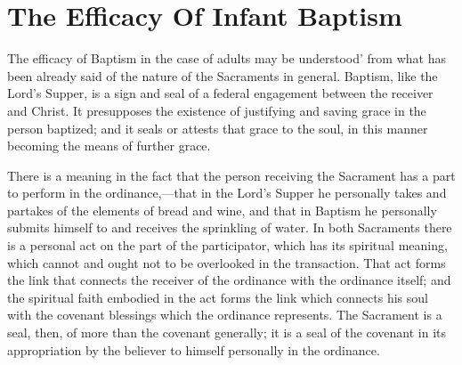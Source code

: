 \documentclass[]{book}
\begin{document}
\hypertarget{the-efficacy-of-infant-baptism}{%
\section{The Efficacy Of Infant Baptism}\label{the-efficacy-of-infant-baptism}}

The efficacy of Baptism in the case of adults may be understood' from what has been already said of the nature of the Sacraments in general. Baptism, like the Lord's Supper, is a sign and seal of a federal engagement between the receiver and Christ. It presupposes the existence of justifying and saving grace in the person baptized; and it seals or attests that grace to the soul, in this manner becoming the means of further grace.

There is a meaning in the fact that the person receiving the Sacrament has a part to perform in the ordinance,---that in the Lord's Supper he personally takes and partakes of the elements of bread and wine, and that in Baptism he personally submits himself to and receives the sprinkling of water. In both Sacraments there is a personal act on the part of the participator, which has its spiritual meaning, which cannot and ought not to be overlooked in the transaction. That act forms the link that connects the receiver of the ordinance with the ordinance itself; and the spiritual faith embodied in the act forms the link which connects his soul with the covenant blessings which the ordinance represents. The Sacrament is a seal, then, of more than the covenant generally; it is a seal of the covenant in its appropriation by the believer to himself personally in the ordinance.
\end{document}
